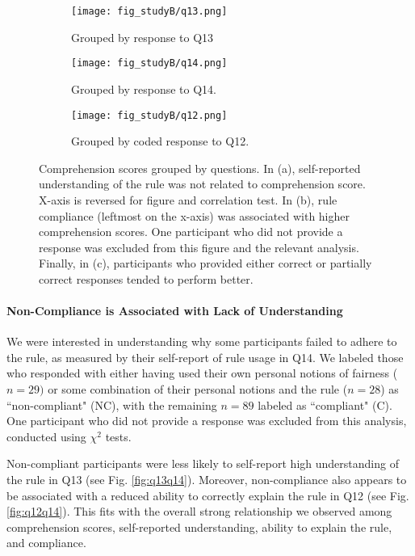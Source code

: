 \documentclass{article}
\begin{document}
 




\begin{figure*}[h]
    \centering
\begin{subfigure}[t]{0.30\textwidth}
    \texttt{[image: fig\_studyB/q13.png]}
    \caption{Grouped by response to Q13}
    \label{fig:studyB_q13}
    \vspace{-5pt}
\end{subfigure}
\quad
\begin{subfigure}[t]{0.30\textwidth}
    \texttt{[image: fig\_studyB/q14.png]}
    \caption{Grouped by response to Q14.}
    \label{fig:studyB_q14}
    \vspace{-5pt}
\end{subfigure}
\quad
\begin{subfigure}[t]{0.30\textwidth}
    \texttt{[image: fig\_studyB/q12.png]}
    \caption{Grouped by coded response to Q12.}
    \label{fig:studyB_q12}
    \vspace{-5pt}
\end{subfigure}
\caption{Comprehension scores grouped by questions. In (a), self-reported understanding of the rule was not related to comprehension score. X-axis is reversed for figure and correlation test. In (b), rule compliance (leftmost on the x-axis) was associated with higher comprehension scores. One participant who did not provide a response was excluded from this figure and the relevant analysis. Finally, in (c), participants who provided either correct or partially correct responses tended to perform better.}
\end{figure*}


\paragraph{Non-Compliance is Associated with Lack of Understanding} \label{results:a:non-comp}

We were interested in understanding why some participants failed to adhere to the rule, as measured by their self-report of rule usage in Q14. We labeled those who responded with either having used their own personal notions of fairness ($n=29)$ or some combination of their personal notions and the rule ($n=28$) as ``non-compliant" (NC), with the remaining $n=89$ labeled as ``compliant" (C). One participant who did not provide a response was excluded from this analysis, conducted using $\chi^2$ tests.

Non-compliant participants were less likely to self-report high understanding of the rule in Q13 (see Fig. \ref{fig:q13q14}). Moreover, non-compliance also appears to be associated with a reduced ability to correctly explain the rule in Q12 (see Fig. \ref{fig:q12q14}). This fits with the overall strong relationship we observed among comprehension scores, self-reported understanding, ability to explain the rule, and compliance. 
\end{document}
